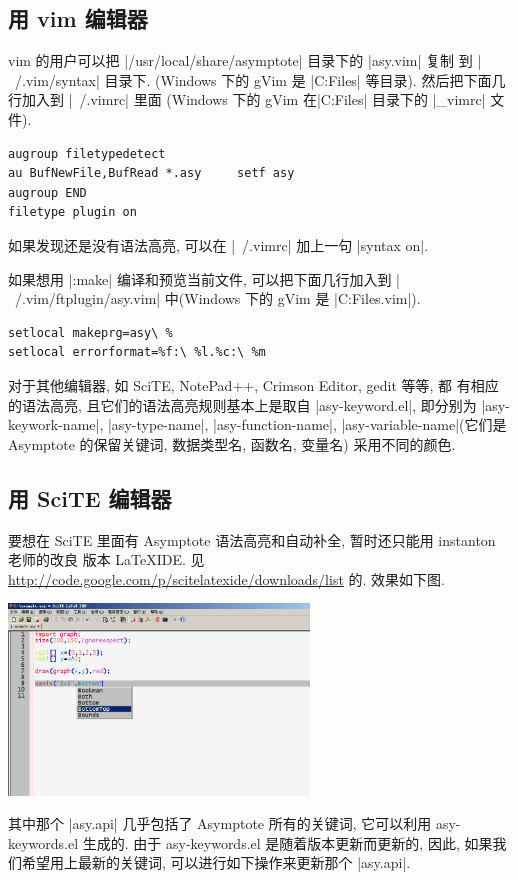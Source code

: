 \documentclass[nofonts,CJKnormalspaces]{ctexbook}[2009/05/20]
\begin{document}
\subsection{用 vim 编辑器}
vim 的用户可以把 |/usr/local/share/asymptote| 目录下的 |asy.vim| 复制
到 |~/.vim/syntax| 目录下. (Windows 下的 gVim 是
|C:\Program Files\Vim\vimfiles\syntax| 等目录). 然后把下面几行加入到
|~/.vimrc| 里面 (Windows 下的 gVim 在|C:\Program Files\Vim| 目录下的
|_vimrc| 文件).
\begin{verbatim}
augroup filetypedetect
au BufNewFile,BufRead *.asy     setf asy
augroup END
filetype plugin on
\end{verbatim}
如果发现还是没有语法高亮, 可以在 |~/.vimrc| 加上一句 |syntax on|.

如果想用 |:make| 编译和预览当前文件, 可以把下面几行加入到
|~/.vim/ftplugin/asy.vim| 中(Windows 下的 gVim 是
|C:\Program Files\Vim\vimfiles\ftplugin\asy.vim|).
\begin{verbatim}
setlocal makeprg=asy\ %
setlocal errorformat=%f:\ %l.%c:\ %m
\end{verbatim}

对于其他编辑器, 如 SciTE, NotePad++, Crimson Editor, gedit 等等, 都
有相应的语法高亮, 且它们的语法高亮规则基本上是取自 |asy-keyword.el|,
即分别为 |asy-keywork-name|, |asy-type-name|, |asy-function-name|,
|asy-variable-name|(它们是 Asymptote 的保留关键词, 数据类型名, 函数名,
变量名) 采用不同的颜色.

\subsection{用 SciTE 编辑器}
要想在 SciTE 里面有 Asymptote 语法高亮和自动补全, 暂时还只能用 instanton 老师的改良
版本 LaTeXIDE. 见
\url{http://code.google.com/p/scitelatexide/downloads/list}
的. 效果如下图.
\begin{center}
  \includegraphics[width=0.6\textwidth]{SciTE.png}
\end{center}
其中那个 |asy.api| 几乎包括了 Asymptote 所有的关键词, 它可以利用
asy-keywords.el 生成的. 由于 asy-keywords.el 是随着版本更新而更新的,
因此, 如果我们希望用上最新的关键词, 可以进行如下操作来更新那个
|asy.api|.
\end{document}

